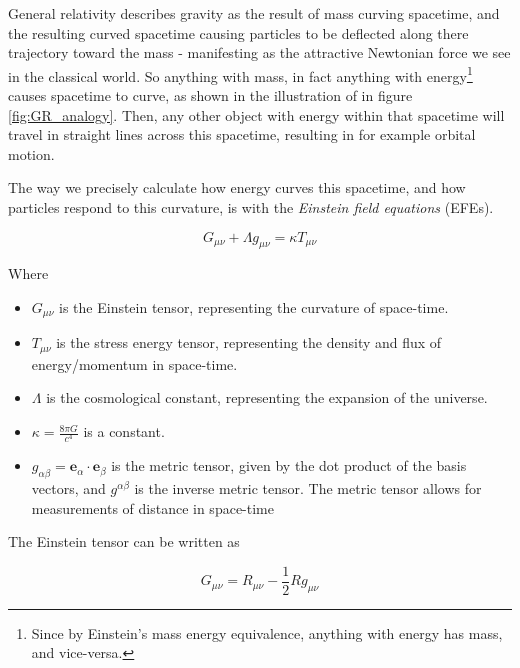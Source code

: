 \documentclass{article}
\begin{document}
General relativity describes gravity as the result of mass curving spacetime, and the resulting curved spacetime causing particles to be deflected along there trajectory toward the mass - manifesting as the attractive Newtonian force we see in the classical world. So anything with mass, in fact anything with energy\footnote{Since by Einstein's mass energy equivalence, anything with energy has mass, and vice-versa.} causes spacetime to curve, as shown in the illustration of in figure \ref{fig:GR_analogy}. Then, any other object with energy within that spacetime will travel in straight lines across this spacetime, resulting in for example orbital motion. 

The way we precisely calculate how energy curves this spacetime, and how particles respond to this curvature, is with the \textit{Einstein field equations} (EFEs).

\begin{equation}
    G_{\mu \nu} + \Lambda g_{\mu \nu} = \kappa T_{\mu \nu}
\label{eq:EFE}
\end{equation}

Where 

\begin{itemize}
    \item $G_{\mu \nu}$ is the Einstein tensor, representing the curvature of space-time.
    
    \item $T_{\mu \nu}$ is the stress energy tensor, representing the density and flux of energy/momentum in space-time.
    
    \item $\Lambda$ is the cosmological constant, representing the expansion of the universe.
    
    \item $\kappa=\frac{8\pi G}{c^4}$ is a constant.
    
    \item $g_{\alpha \beta} = \boldsymbol{e}_\alpha \cdot \boldsymbol{e}_\beta$ is the metric tensor, given by the dot product of the basis vectors, and $g^{\alpha \beta}$ is the inverse metric tensor. The metric tensor allows for measurements of distance in space-time
 \end{itemize}


The Einstein tensor can be written as

\begin{equation}
    G_{\mu \nu } = R_{\mu \nu} - \frac{1}{2} R g_{\mu \nu}
\label{eq:Einstein tensor}
\end{equation}
\end{document}
